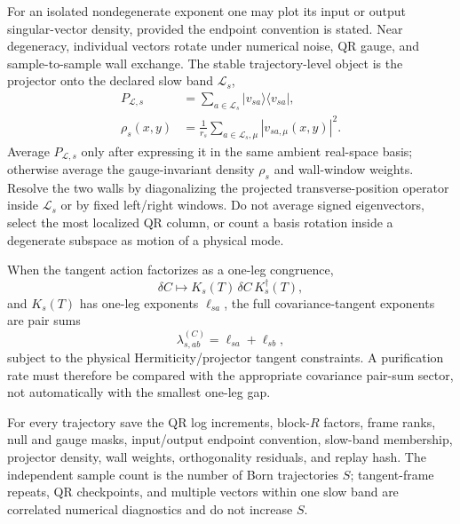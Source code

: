 \documentclass[aps,prx,twocolumn,floatfix,nofootinbib,superscriptaddress,longbibliography]{revtex4-2}
\begin{document}
For an isolated nondegenerate exponent one may plot its input or output singular-vector
density, provided the endpoint convention is stated.  Near degeneracy, individual vectors
rotate under numerical noise, QR gauge, and sample-to-sample wall exchange.  The stable
trajectory-level object is the projector onto the declared slow band $\mathcal L_s$,
\begin{equation}
 \begin{aligned}
 P_{\mathcal L,s}
 &=\sum_{a\in\mathcal L_s}|v_{sa}\rangle\langle v_{sa}|,\\
 \rho_s(x,y)
 &=\frac1{r_s}\sum_{a\in\mathcal L_s,\mu}|v_{sa,\mu}(x,y)|^2.
 \end{aligned}
 \label{eq:slow-subspace-projector-density}
\end{equation}
Average $P_{\mathcal L,s}$ only after expressing it in the same ambient real-space basis;
otherwise average the gauge-invariant density $\rho_s$ and wall-window weights.  Resolve
the two walls by diagonalizing the projected transverse-position operator inside
$\mathcal L_s$ or by fixed left/right windows.  Do not average signed eigenvectors, select
the most localized QR column, or count a basis rotation inside a degenerate subspace as
motion of a physical mode.

When the tangent action factorizes as a one-leg congruence,
\begin{equation}
 \delta C\longmapsto K_s(T)\,\delta C\,K_s^\dagger(T),
 \label{eq:one-leg-tangent-congruence}
\end{equation}
and $K_s(T)$ has one-leg exponents $\ell_{sa}$, the full covariance-tangent exponents are
pair sums
\begin{equation}
 \lambda_{s,ab}^{(C)}=\ell_{sa}+\ell_{sb},
 \label{eq:covariance-pair-sum-exponents}
\end{equation}
subject to the physical Hermiticity/projector tangent constraints.  A purification rate
must therefore be compared with the appropriate covariance pair-sum sector, not
automatically with the smallest one-leg gap.

For every trajectory save the QR log increments, block-$R$ factors, frame ranks, null and
gauge masks, input/output endpoint convention, slow-band membership, projector density,
wall weights, orthogonality residuals, and replay hash.  The independent sample count is
the number of Born trajectories $S$; tangent-frame repeats, QR checkpoints, and multiple
vectors within one slow band are correlated numerical diagnostics and do not increase
$S$.
\end{document}
